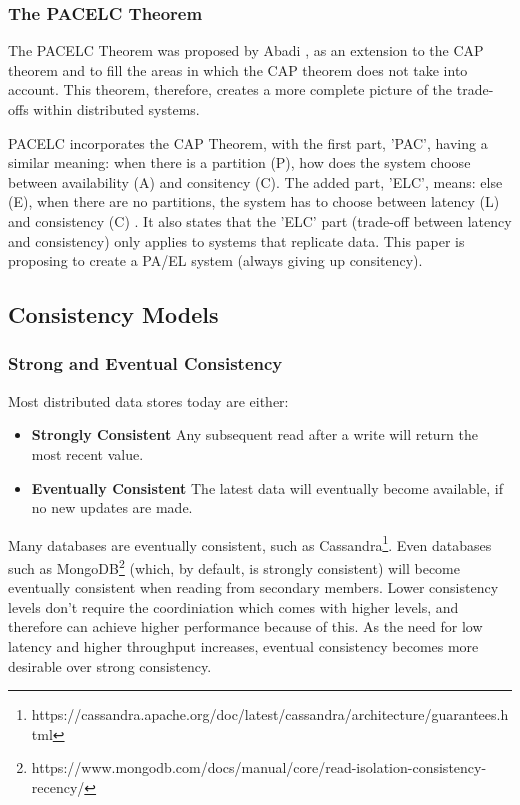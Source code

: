 \documentclass[12pt]{article}
\begin{document}
\subsubsection{The PACELC Theorem}
The PACELC Theorem was proposed by Abadi \cite{6127847}, as an extension to the CAP theorem and to fill the areas in which the CAP theorem does not take into account. This theorem, therefore, creates a more complete picture of the trade-offs within distributed systems. \par
PACELC incorporates the CAP Theorem, with the first part, 'PAC', having a similar meaning: when there is a partition (P), how does the system choose between availability (A) and consitency (C). The added part, 'ELC', means: else (E), when there are no partitions, the system has to choose between latency (L) and consistency (C) \cite{6127847}. It also states that the 'ELC' part (trade-off between latency and consistency) only applies to systems that replicate data. This paper is proposing to create a PA/EL \cite{6127847} system (always giving up consitency).

\subsection{Consistency Models}
\subsubsection{Strong and Eventual Consistency}
Most distributed data stores today are either:
\begin{itemize}
    \item \textbf{Strongly Consistent} Any subsequent read after a write will return the most recent value.
    \item \textbf{Eventually Consistent} The latest data will eventually become available, if no new updates are made.
\end{itemize}
Many databases are eventually consistent, such as Cassandra\footnote{https://cassandra.apache.org/doc/latest/cassandra/architecture/guarantees.html}. Even databases such as MongoDB\footnote{https://www.mongodb.com/docs/manual/core/read-isolation-consistency-recency/} (which, by default, is strongly consistent) will become eventually consistent when reading from secondary members. Lower consistency levels don't require the coordiniation which comes with higher levels, and therefore can achieve higher performance because of this. As the need for low latency and higher throughput increases, eventual consistency becomes more desirable over strong consistency. \par
\end{document}

